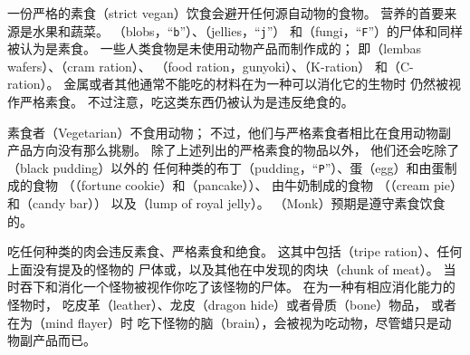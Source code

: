 \documentclass[a4paper, 10pt]{article}
\begin{document}
一份严格的素食（strict vegan）饮食会避开任何源自动物的食物。
营养的首要来源是水果和蔬菜。
\zhTransBlobs（blobs，“{\tt b}”）、\zhTransJellies（jellies，“{\tt j}”）
和\zhTransFungi（fungi，“{\tt F}”）的尸体和\zhTransTin{}同样被认为是素食。
一些人类食物是未使用动物产品而制作成的；
即\zhTransLembasWafers（lembas wafers）、\zhTransCramRation（cram ration）、
\zhTransFoodRation（food ration，gunyoki）、\zhTransKRation（K-ration）
和\zhTransCRation（C-ration）。
金属或者其他通常不能吃的材料在\zhTransPolymorph{}为一种可以消化它的生物时
仍然被视作严格素食。
不过注意，吃这类东西仍被认为是违反绝食\zhTransConduct{}的。

素食者（Vegetarian）不食用动物；
不过，他们与严格素食者相比在食用动物副产品方向没有那么挑剔。
除了上述列出的严格素食的物品以外，
他们还会吃除了\zhTransBlackPudding（black pudding）以外的
任何种类的布丁（pudding，“{\tt P}”）、蛋（egg）和由蛋制成的食物
（\zhTransFortuneCookie（fortune cookie）和\zhTransPancake（pancake））、
由牛奶制成的食物
（\zhTransCreamPie（cream pie）和\zhTransCandyBar（candy bar））
以及\zhTransLumpOfRoyalJelly（lump of royal jelly）。
\zhTransMonks{}（Monk）预期是遵守素食饮食的。

吃任何种类的肉会违反素食、严格素食和绝食\zhTransConduct。
这其中包括\zhTransTripeRation（tripe ration）、任何上面没有提及的怪物的
尸体或\zhTransTin，以及其他在\zhTransDungeon{}中发现的肉块（chunk of meat）。
当\zhTransPolymorph{}时吞下和消化一个怪物被视作你吃了该怪物的尸体。
在\zhTransPolymorph{}为一种有相应消化能力的怪物时，
吃皮革（leather）、龙皮（dragon hide）或者骨质（bone）物品，
或者在\zhTransPolymorph{}为\zhTransMindFlayer（mind flayer）时
吃下怪物的脑（brain），会被视为吃动物，尽管蜡只是动物副产品而已。
\end{document}
